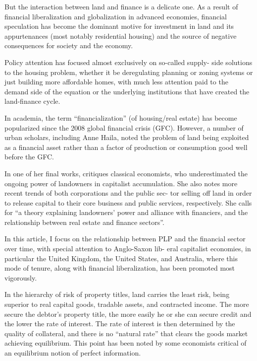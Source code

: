\documentclass[
]{book}
\begin{document}
But the interaction between land and finance is a delicate one.
As a result of financial liberalization and globalization in advanced
economies, financial speculation has become the dominant motive
for investment in land and its appurtenances (most notably residential
housing) and the source of negative consequences for society and the
economy.

Policy attention has focused almost exclusively on so-­called supply-­
side solutions to the housing problem, whether it be deregulating
planning or zoning systems or just building more affordable homes,
with much less attention paid to the demand side of the equation or
the underlying institutions that have created the land-­finance cycle.

In academia, the term ``financialization'' (of housing/real estate)
has become popularized since the 2008 global financial crisis (GFC).
However, a number of urban scholars, including Anne Haila, noted
the problem of land being exploited as a financial asset rather than
a factor of production or consumption good well before the GFC.

In one of her final works,
critiques classical economists, who underestimated
the ongoing power of landowners in capitalist accumulation. She also
notes more recent trends of both corporations and the public sec-
tor selling off land in order to release capital to their core business
and public services, respectively. She calls for ``a theory explaining
landowners' power and alliance with financiers, and the relationship
between real estate and finance sectors''.

In this article, I focus on the relationship between PLP and the
financial sector over time, with special attention to Anglo-­Saxon lib-
eral capitalist economies, in particular the United Kingdom, the United
States, and Australia, where this mode of tenure, along with financial
liberalization, has been promoted most vigorously.

In the hierarchy of risk of property titles, land carries the least risk,
being superior to real capital goods, tradable assets, and contracted
income. The more secure the debtor's property title, the more easily he
or she can secure credit and the lower the rate of interest. The rate of
interest is then determined by the quality of collateral, and there is no
``natural rate'' that clears the goods market achieving equilibrium. This
point has been noted by some economists critical of an equilibrium
notion of perfect information.
\end{document}
